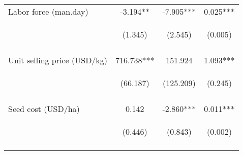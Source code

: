 \begin{center}
\begin{tabular}{lccc}
Labor force (man.day) & -3.194** & -7.905*** & 0.025*** \\
 & \begin{footnotesize}(1.345)\end{footnotesize} & \begin{footnotesize}(2.545)\end{footnotesize} & \begin{footnotesize}(0.005)\end{footnotesize} \\
\vspace{4pt} & \begin{footnotesize}[0.018]\end{footnotesize} & \begin{footnotesize}[0.002]\end{footnotesize} & \begin{footnotesize}[0.000]\end{footnotesize} \\
Unit selling price (USD/kg) & 716.738*** & 151.924 & 1.093*** \\
 & \begin{footnotesize}(66.187)\end{footnotesize} & \begin{footnotesize}(125.209)\end{footnotesize} & \begin{footnotesize}(0.245)\end{footnotesize} \\
\vspace{4pt} & \begin{footnotesize}[0.000]\end{footnotesize} & \begin{footnotesize}[0.225]\end{footnotesize} & \begin{footnotesize}[0.000]\end{footnotesize} \\
Seed cost (USD/ha) & 0.142 & -2.860*** & 0.011*** \\
 & \begin{footnotesize}(0.446)\end{footnotesize} & \begin{footnotesize}(0.843)\end{footnotesize} & \begin{footnotesize}(0.002)\end{footnotesize} \\
\vspace{4pt} & \begin{footnotesize}[0.750]\end{footnotesize} & \begin{footnotesize}[0.001]\end{footnotesize} & \begin{footnotesize}[0.000]\end{footnotesize} \\

\end{tabular}
\end{center}
